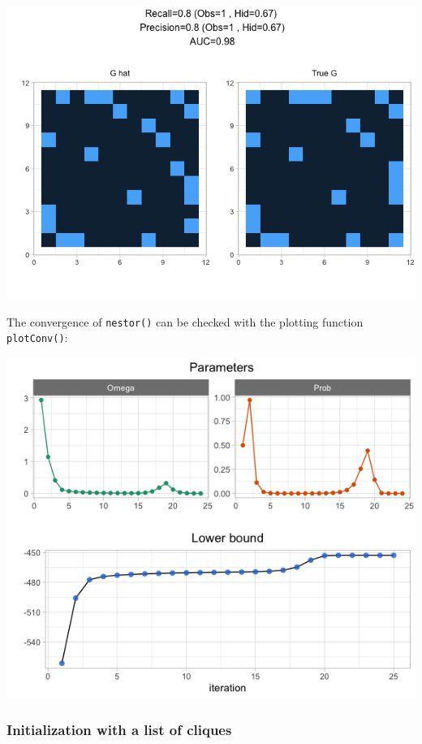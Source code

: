 \begin{center}\includegraphics[width=0.8\linewidth]{nestorArticle/man/figures/README-unnamed-chunk-9-1} \end{center}

The convergence of \texttt{nestor()} can be checked with the plotting
function \texttt{plotConv()}:

\begin{Shaded}
\begin{Highlighting}[]
\NormalTok{(}
\end{Highlighting}
\end{Shaded}

\begin{center}\includegraphics[width=0.8\linewidth]{nestorArticle/man/figures/README-unnamed-chunk-10-1} \end{center}

\subsubsection{Initialization with a list of
cliques}\label{initialization-with-a-list-of-cliques}

